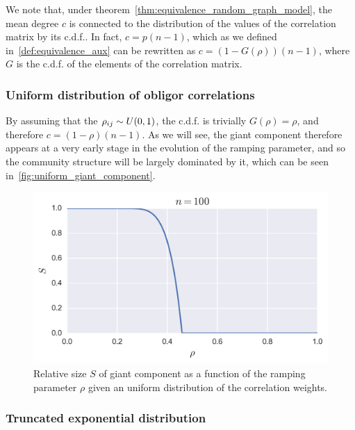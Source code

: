 We note that, under theorem~\ref{thm:equivalence_random_graph_model}, the mean degree $c$ is connected to the distribution of the values of the correlation matrix by its c.d.f..
In fact, $c = p (n-1)$, which as we defined in~\ref{def:equivalence_aux} can be rewritten as $c = (1-G(\rho)) (n-1)$, where $G$ is the c.d.f. of the elements of the correlation matrix.


\subsubsection{Uniform distribution of obligor correlations} %
\label{ssub:uniform_distribution}

By assuming that the $\rho_{ij} \sim  U(0,1)$, the c.d.f. is trivially $G(\rho) = \rho$, and therefore $c = (1 -\rho)(n-1)$.
As we will see, the giant component therefore appears at a very early stage in the evolution of the ramping parameter, and so the community structure will be largely dominated by it, which can be seen in~\vref{fig:uniform_giant_component}.
\begin{figure}[tb]
	\centering
	\includegraphics[scale=.8]{figures/3_uniform_giant_component.png}
	\caption{Relative size $S$ of giant component as a function of the ramping parameter $\rho$ given an uniform distribution of the correlation weights.}
	\label{fig:uniform_giant_component}
\end{figure}


\subsubsection{Truncated exponential distribution} %
\label{ssub:truncated_exponential_distribution}

